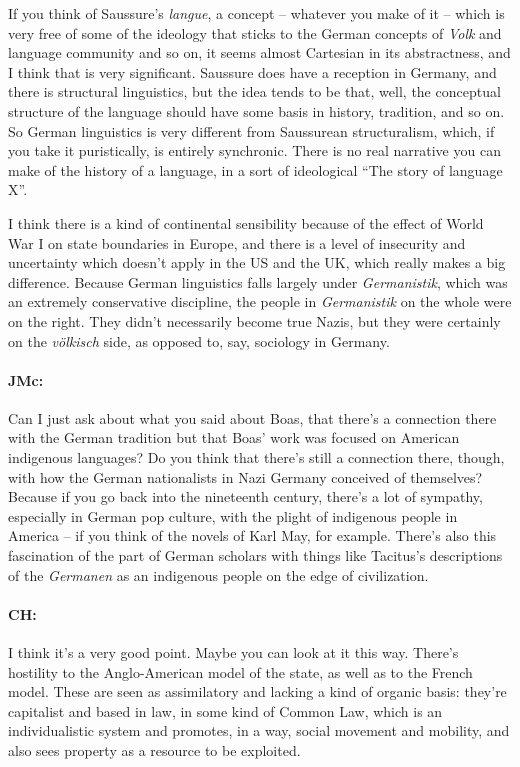 \documentclass[output=paper]{langscibook}
\begin{document}
If you think of Saussure’s \textit{langue}, a concept – whatever you make of it – which is very free of some of the ideology that sticks to the German concepts of \textit{Volk} and language community and so on, it seems almost Cartesian in its abstractness, and I think that is very significant. Saussure does have a reception in Germany, and there is structural linguistics, but the idea tends to be that, well, the conceptual structure of the language should have some basis in history, tradition, and so on. So German linguistics is very different from Saussurean structuralism, which, if you take it puristically, is entirely synchronic. There is no real narrative you can make of the history of a language, in a sort of ideological “The story of language X”.

I think there is a kind of continental sensibility because of the effect of World War I on state boundaries in Europe, and there is a level of insecurity and uncertainty which doesn’t apply in the US and the UK, which really makes a big difference. Because German linguistics falls largely under \textit{Germanistik}, which was an extremely conservative discipline, the people in \textit{Germanistik} on the whole were on the right. They didn’t necessarily become true Nazis, but they were certainly on the \textit{völkisch} side, as opposed to, say, sociology in Germany.

\paragraph*{JMc:} Can I just ask about what you said about Boas, that there’s a connection there with the German tradition but that Boas’ work was focused on American indigenous languages? Do you think that there’s still a connection there, though, with how the German nationalists in Nazi Germany conceived of themselves? Because if you go back into the nineteenth century, there’s a lot of sympathy, especially in German pop culture, with the plight of indigenous people in America – if you think of the novels of Karl May, for example. There’s also this fascination of the part of German scholars with things like Tacitus’s descriptions of the \textit{Germanen} as an indigenous people on the edge of civilization.

\paragraph*{CH:} I think it’s a very good point. Maybe you can look at it this way. There’s hostility to the Anglo-American model of the state, as well as to the French model. These are seen as assimilatory and lacking a kind of organic basis: they’re capitalist and based in law, in some kind of Common Law, which is an individualistic system and promotes, in a way, social movement and mobility, and also sees property as a resource to be exploited.
\end{document}
